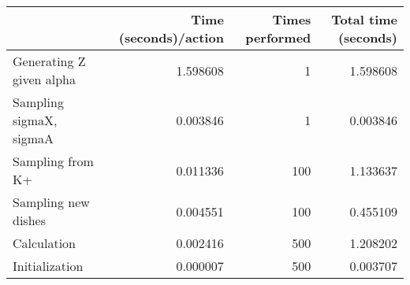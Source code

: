 \begin{tabular}{lrrr}
\toprule
{} &  Time (seconds)/action &  Times performed &  Total time (seconds) \\
\midrule
Generating Z given alpha &               1.598608 &                1 &              1.598608 \\
Sampling sigmaX, sigmaA  &               0.003846 &                1 &              0.003846 \\
Sampling from K+         &               0.011336 &              100 &              1.133637 \\
Sampling new dishes      &               0.004551 &              100 &              0.455109 \\
Calculation              &               0.002416 &              500 &              1.208202 \\
Initialization           &               0.000007 &              500 &              0.003707 \\
\bottomrule
\end{tabular}
